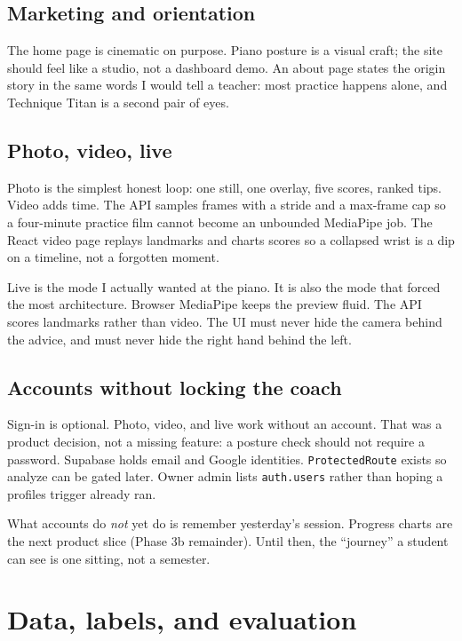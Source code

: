 \documentclass[11pt,a4paper]{article}
\newcommand{\code}[1]{\texttt{#1}}
\begin{document}
\subsection{Marketing and orientation}

The home page is cinematic on purpose.
Piano posture is a visual craft; the site should feel like a studio, not a dashboard demo.
An about page states the origin story in the same words I would tell a teacher: most practice happens alone, and Technique Titan is a second pair of eyes.

\subsection{Photo, video, live}

Photo is the simplest honest loop: one still, one overlay, five scores, ranked tips.
Video adds time.
The API samples frames with a stride and a max-frame cap so a four-minute practice film cannot become an unbounded MediaPipe job.
The React video page replays landmarks and charts scores so a collapsed wrist is a dip on a timeline, not a forgotten moment.

Live is the mode I actually wanted at the piano.
It is also the mode that forced the most architecture.
Browser MediaPipe keeps the preview fluid.
The API scores landmarks rather than video.
The UI must never hide the camera behind the advice, and must never hide the right hand behind the left.

\subsection{Accounts without locking the coach}

Sign-in is optional.
Photo, video, and live work without an account.
That was a product decision, not a missing feature: a posture check should not require a password.
Supabase holds email and Google identities.
\code{ProtectedRoute} exists so analyze can be gated later.
Owner admin lists \code{auth.users} rather than hoping a profiles trigger already ran.

What accounts do \emph{not} yet do is remember yesterday's session.
Progress charts are the next product slice (Phase 3b remainder).
Until then, the \enquote{journey} a student can see is one sitting, not a semester.

\section{Data, labels, and evaluation}
\label{sec:eval}
\end{document}
